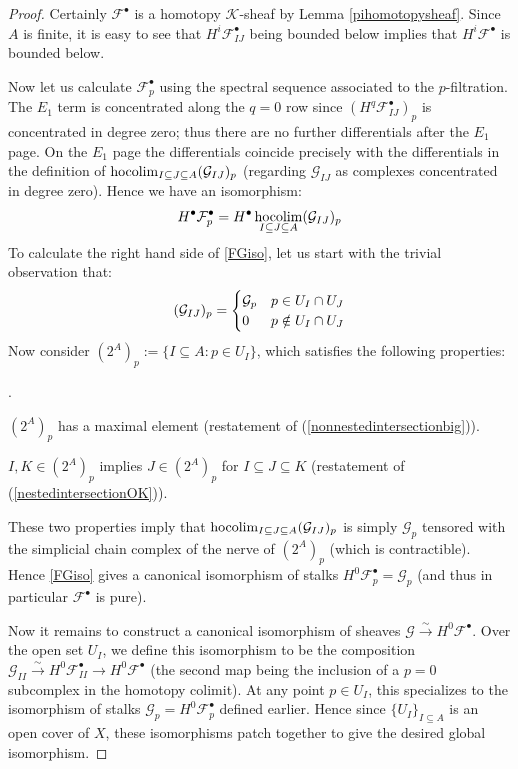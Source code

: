 \documentclass[12pt]{article}
\theoremstyle{definition}
\theoremstyle{remark}
\numberwithin{equation}{subsection}
\newcommand{\F}{\mathcal F}
\newcommand{\G}{\mathcal G}
\newcommand{\K}{\mathcal K}
\newcommand{\hocolim}{\operatornamewithlimits{hocolim}}
\newcounter{rcounti}
\newenvironment{rlist}{\begin{list}{\roman{rcounti}.}{\usecounter{rcounti}
\setlength\itemsep{0pt}
\setlength\labelsep{4pt}
\setlength\labelwidth{16pt}
\setlength\leftmargin{32pt}
\setlength\listparindent{0pt}
\setlength\parsep{0pt}
\setlength\parskip{0pt}
\setlength\partopsep{0pt}
\setlength\rightmargin{0pt}
\setlength\topsep{0pt}
\setlength\itemindent{0pt}
}}{\end{list}}
\begin{document}
\begin{proof}
Certainly $\F^\bullet$ is a homotopy $\K$-sheaf by Lemma \ref{pihomotopysheaf}.  Since $A$ is finite, it is easy to see that $H^i\F^\bullet_{IJ}$ being bounded below implies that $H^i\F^\bullet$ is bounded below.

Now let us calculate $\F^\bullet_p$ using the spectral sequence associated to the $p$-filtration.  The $E_1$ term is concentrated along the $q=0$ row since $(H^q\F^\bullet_{IJ})_p$ is concentrated in degree zero; thus there are no further differentials after the $E_1$ page.  On the $E_1$ page the differentials coincide precisely with the differentials in the definition of $\hocolim_{I\subseteq J\subseteq A}(\G_{IJ})_p$ (regarding $\G_{IJ}$ as complexes concentrated in degree zero).  Hence we have an isomorphism:
\begin{equation}\label{FGiso}
H^\bullet\F^\bullet_p=H^\bullet\hocolim_{I\subseteq J\subseteq A}(\G_{IJ})_p
\end{equation}
To calculate the right hand side of \eqref{FGiso}, let us start with the trivial observation that:
\begin{equation}
(\G_{IJ})_p=\begin{cases}\G_p&p\in U_I\cap U_J\cr 0&p\notin U_I\cap U_J\end{cases}
\end{equation}
Now consider $(2^A)_p:=\{I\subseteq A:p\in U_I\}$, which satisfies the following properties:
\begin{rlist}
\item$(2^A)_p$ has a maximal element (restatement of (\ref{nonnestedintersectionbig})).
\item$I,K\in(2^A)_p$ implies $J\in(2^A)_p$ for $I\subseteq J\subseteq K$ (restatement of (\ref{nestedintersectionOK})).
\end{rlist}
These two properties imply that $\hocolim_{I\subseteq J\subseteq A}(\G_{IJ})_p$ is simply $\G_p$ tensored with the simplicial chain complex of the nerve of $(2^A)_p$ (which is contractible).  Hence \eqref{FGiso} gives a canonical isomorphism of stalks $H^0\F^\bullet_p=\G_p$ (and thus in particular $\F^\bullet$ is pure).

Now it remains to construct a canonical isomorphism of sheaves $\G\xrightarrow\sim H^0\F^\bullet$.  Over the open set $U_I$, we define this isomorphism to be the composition $\G_{II}\xrightarrow\sim H^0\F_{II}^\bullet\to H^0\F^\bullet$ (the second map being the inclusion of a $p=0$ subcomplex in the homotopy colimit).  At any point $p\in U_I$, this specializes to the isomorphism of stalks $\G_p=H^0\F^\bullet_p$ defined earlier.  Hence since $\{U_I\}_{I\subseteq A}$ is an open cover of $X$, these isomorphisms patch together to give the desired global isomorphism.
\end{proof}
\end{document}
